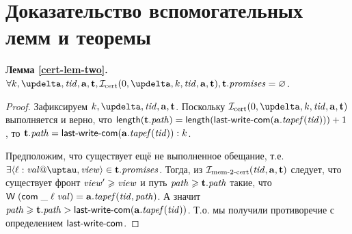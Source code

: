 \section{Доказательство вспомогательных лемм и теоремы}

\noindent
{\bf Лемма \ref{cert-lem-two}.}
$\forall k, \delta, \tId, \aT, \tT, \invCert(0, \delta, k, \tId, \aT, \tT), \tT.\PromSet = \emptyset$.
\begin{proof}%
  Зафиксируем $k, \delta, \tId, \aT, \tT$.
  Поскольку $\invCert(0, \delta, k, \tId, \aT, \tT)$ выполняется и верно, что 
  $\length(\tT.\cpath) = \length(\lastCommittedWrite(\aT.\tapef(\tId))) + 1$, то
  $\tT.\cpath = \lastCommittedWrite(\aT.\tapef(\tId)):k$.
  
  Предположим, что существует ещё не выполненное обещание,
  т.е. $\exists \writeEvt{\loc}{\stval}{\tau}{\R} \in \tT.\PromSet$.
  Тогда, из $\mathcal{I}_{\textup{\rm mem-2-cert}}(\mathit{tid}, \mathbf{a}, \mathbf{t})$ следует, что
  существует фронт $\mathit{view}' \geqslant \mathit{view}$ и путь $\mathit{path} \geqslant \mathbf{t}.\mathit{path}$ такие, что
  $\textsf{W} \; (\mathsf{com} \; \_ \; \ell \; \mathit{val}) = \mathbf{a}.\mathit{tapef}(\mathit{tid}, \mathit{path})$.
  А значит 
  $\mathit{path} \geqslant \mathbf{t}.\mathit{path} > \textup{\sf last-write-com}(\mathbf{a}.\mathit{tapef}(\mathit{tid}))$.
  Т.о. мы получили противоречие с определением $\textup{\sf last-write-com}$.
\end{proof}


